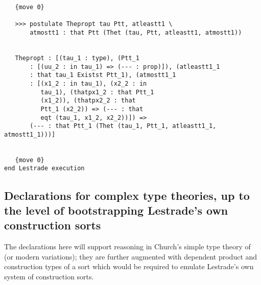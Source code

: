 \documentclass[12pt]{article}
\begin{document}
\begin{verbatim}
   {move 0}

   >>> postulate Thepropt tau Ptt, atleastt1 \
       atmostt1 : that Ptt (Thet (tau, Ptt, atleastt1, atmostt1))


   Thepropt : [(tau_1 : type), (Ptt_1 
       : [(uu_2 : in tau_1) => (--- : prop)]), (atleastt1_1 
       : that tau_1 Existst Ptt_1), (atmostt1_1 
       : [(x1_2 : in tau_1), (x2_2 : in 
          tau_1), (thatpx1_2 : that Ptt_1 
          (x1_2)), (thatpx2_2 : that 
          Ptt_1 (x2_2)) => (--- : that 
          eqt (tau_1, x1_2, x2_2))]) => 
       (--- : that Ptt_1 (Thet (tau_1, Ptt_1, atleastt1_1, atmostt1_1)))]


   {move 0}
end Lestrade execution
\end{verbatim}

\subsection{Declarations for complex type theories, up to the level of bootstrapping Lestrade's own construction sorts}

The declarations here will support reasoning in Church's simple type theory  of \cite{churchtypes} (or modern variations); they are further augmented with dependent product and construction types of a sort which would be required to emulate Lestrade's own system of construction sorts.
\end{document}
